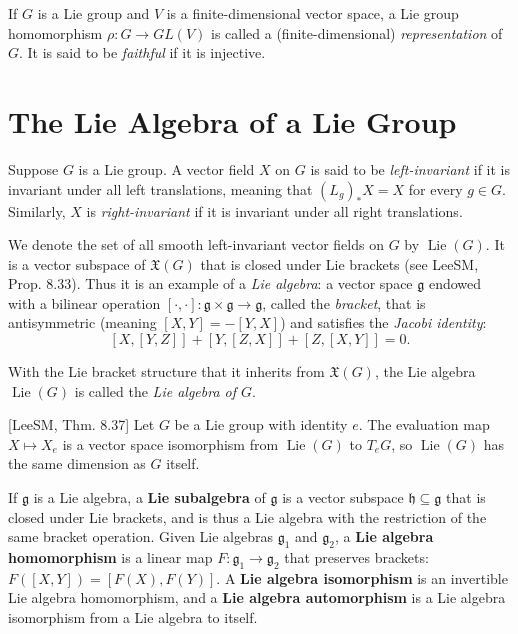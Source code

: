 If $G$ is a Lie group and $V$ is a finite-dimensional vector space, a Lie group homomorphism $\rho: G \to GL(V)$ is called a (finite-dimensional) \emph{representation} of $G$. It is said to be \emph{faithful} if it is injective.

\section{The Lie Algebra of a Lie Group}

Suppose $G$ is a Lie group. A vector field $X$ on $G$ is said to be \emph{left-invariant} if it is invariant under all left translations, meaning that $(L_g)_* X = X$ for every $g \in G$. Similarly, $X$ is \emph{right-invariant} if it is invariant under all right translations.

We denote the set of all smooth left-invariant vector fields on $G$ by $\operatorname{Lie}(G)$. It is a vector subspace of $\mathfrak{X}(G)$ that is closed under Lie brackets (see LeeSM, Prop. 8.33). Thus it is an example of a \emph{Lie algebra}: a vector space $\mathfrak{g}$ endowed with a bilinear operation $[\cdot, \cdot]: \mathfrak{g} \times \mathfrak{g} \to \mathfrak{g}$, called the \emph{bracket}, that is antisymmetric (meaning $[X, Y] = -[Y, X]$) and satisfies the \emph{Jacobi identity}:
\[
[X, [Y, Z]] + [Y, [Z, X]] + [Z, [X, Y]] = 0.
\]

With the Lie bracket structure that it inherits from $\mathfrak{X}(G)$, the Lie algebra $\operatorname{Lie}(G)$ is called the \textit{Lie algebra of $G$}.

\begin{proposition}\label{prop:evaluation-map-lie-algebra-isomorphism}
[LeeSM, Thm. 8.37] Let $G$ be a Lie group with identity $e$. The evaluation map $X \mapsto X_e$ is a vector space isomorphism from $\operatorname{Lie}(G)$ to $T_e G$, so $\operatorname{Lie}(G)$ has the same dimension as $G$ itself.
\end{proposition}

If $\mathfrak{g}$ is a Lie algebra, a \textbf{Lie subalgebra} of $\mathfrak{g}$ is a vector subspace $\mathfrak{h} \subseteq \mathfrak{g}$ that is closed under Lie brackets, and is thus a Lie algebra with the restriction of the same bracket operation. Given Lie algebras $\mathfrak{g}_1$ and $\mathfrak{g}_2$, a \textbf{Lie algebra homomorphism} is a linear map $F: \mathfrak{g}_1 \to \mathfrak{g}_2$ that preserves brackets: $F([X, Y]) = [F(X), F(Y)]$. A \textbf{Lie algebra isomorphism} is an invertible Lie algebra homomorphism, and a \textbf{Lie algebra automorphism} is a Lie algebra isomorphism from a Lie algebra to itself.

